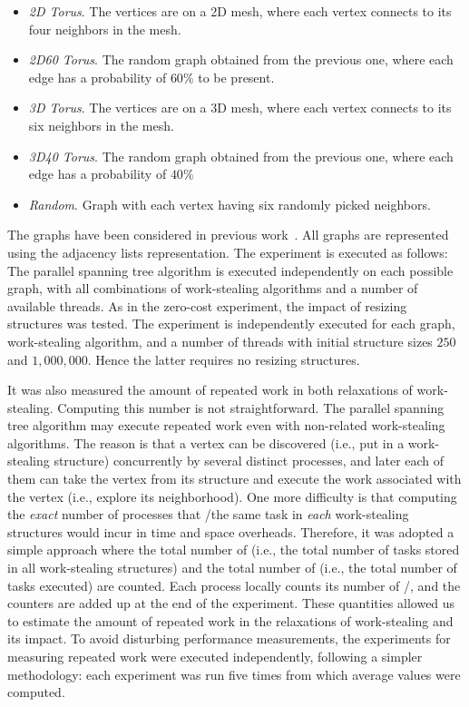 \begin{itemize}
    \item \textit{2D Torus}. The vertices are on a 2D mesh, where each vertex connects to its four neighbors in the mesh.
    \item \textit{2D60 Torus}. The random graph obtained from the previous one, where each edge has a probability of $60\%$
to be present.
    \item \textit{3D Torus}. The vertices are on a 3D mesh, where each vertex connects to its six neighbors in the mesh.
    \item \textit{3D40 Torus}. The random graph obtained from the previous one, where each edge has a probability of $40\%$
    \item \textit{Random}. Graph with each vertex having six randomly picked neighbors.
\end{itemize}


The graphs have been considered in previous work~\cite{1302951, maged.vechev.2009, fencefreework}.  All graphs are represented using the adjacency lists representation. The experiment is executed as follows: The parallel spanning tree algorithm is executed independently on each possible graph, with all combinations of work-stealing algorithms and a number of available threads.  As in the zero-cost experiment, the impact of resizing structures was tested. The experiment is independently executed for each graph, work-stealing algorithm, and a number of threads with initial structure sizes $250$ and $1,000,000$. Hence the latter requires no resizing structures.

It was also measured the amount of repeated work in both relaxations of work-stealing.  Computing this number is not straightforward.  The parallel spanning tree algorithm may execute repeated work even with non-related work-stealing algorithms. The reason is that a vertex can be discovered (i.e., put in a work-stealing structure) concurrently by several distinct processes, and later each of them can take the vertex from its structure and execute the work associated with the vertex (i.e., explore its neighborhood).  One more difficulty is that computing the \emph{exact} number of processes that \Take/\Steal the same task in \emph{each} work-stealing structures would incur in time and space overheads.  Therefore, it was adopted a simple approach where the total number of \Puts (i.e., the total number of tasks stored in all work-stealing structures) and the total number of \Takes (i.e., the total number of tasks executed) are counted.  Each process locally counts its number of \Puts/\Takes, and the counters are added up at the end of the experiment.  These quantities allowed us to estimate the amount of repeated work in the relaxations of work-stealing and its impact.  To avoid disturbing performance measurements, the experiments for measuring repeated work were executed independently, following a simpler methodology: each experiment was run five times from which average values were computed.

